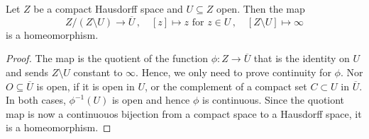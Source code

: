 \begin{lemma}\label{lem:orient-quotientIsCompactification}
	Let $Z$ be a compact Hausdorff space and $U\subseteq Z$ open. Then the map
	\begin{equation*}
		Z\big/ (Z\setminus U)\to \overline{U}\,,\quad [z]\mapsto z \text{ for } z\in U\,,\quad [Z\setminus U]\mapsto \infty
	\end{equation*}
	is a homeomorphism.
\end{lemma}
\begin{proof}
    The map is the quotient of the function $\phi:Z\to \overline{U}$ that is the identity on $U$ and sends $Z\setminus U$ constant to $\infty$. Hence, we only need to prove continuity for $\phi$. Nor $O\subseteq \overline{U}$ is open, if it is open in $U$, or the complement of a compact set $C\subset U$ in $\overline{U}$. In both cases, $\phi^{-1}(U)$ is open and hence $\phi$ is continuous. Since the quotiont map is now a continuouos bijection from a compact space to a Hausdorff space, it is a homeomorphism.
\end{proof}

